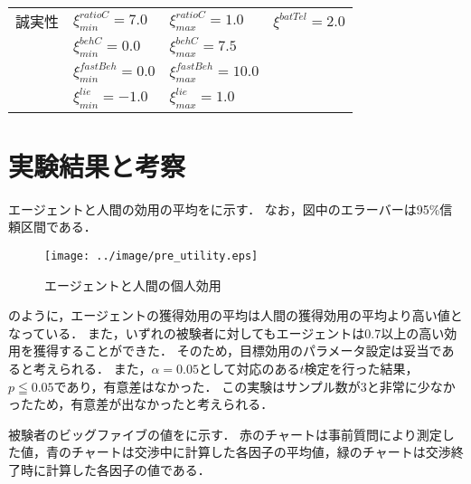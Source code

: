 \begin{table}[tb]
\begin{tabular}{llll}
        誠実性 & $\xi_{min}^{\mathit{ratioC}} = 7.0$ & $\xi_{max}^{\mathit{ratioC}} = 1.0$ & $\xi^{batTel} = 2.0$ \\
        & $\xi_{min}^{\mathit{behC}} = 0.0$ & $\xi_{max}^{\mathit{behC}} = 7.5$ \\
        & $\xi_{min}^{\mathit{fastBeh}} = 0.0$ & $\xi_{max}^{\mathit{fastBeh}} = 10.0$ \\
        & $\xi_{min}^{\mathit{lie}} = -1.0$ & $\xi_{max}^{\mathit{lie}} = 1.0$ \\ \bottomrule
    \end{tabular}
    \label{tab:xi-param}
\end{table}

\clearpage

\section{実験結果と考察}
エージェントと人間の効用の平均をに示す．
なお，図中のエラーバーは95\%信頼区間である．

\begin{figure}[bt]
    \centering
    \texttt{[image: ../image/pre\_utility.eps]}
    \caption{エージェントと人間の個人効用}
    \label{fig:pre_util}
\end{figure}

のように，エージェントの獲得効用の平均は人間の獲得効用の平均より高い値となっている．
また，いずれの被験者に対してもエージェントは0.7以上の高い効用を獲得することができた．
そのため，目標効用のパラメータ設定は妥当であると考えられる．
また，$\alpha = 0.05$として対応のある$t$検定を行った結果，$p \leqq 0.05$であり，有意差はなかった．
この実験はサンプル数が3と非常に少なかったため，有意差が出なかったと考えられる．

被験者のビッグファイブの値をに示す．
赤のチャートは事前質問により測定した値，青のチャートは交渉中に計算した各因子の平均値，緑のチャートは交渉終了時に計算した各因子の値である．

